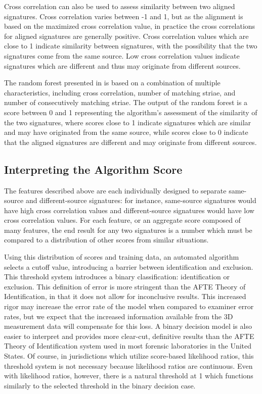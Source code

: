 \documentclass[doubleblind]{elsarticle}\usepackage[]{graphicx}\usepackage[]{color}
\begin{document}

Cross correlation can also be used to assess similarity between two aligned signatures. Cross correlation varies between -1 and 1, but as the alignment is based on the maximized cross correlation value, in practice the cross correlations for aligned signatures are generally positive. Cross correlation values which are close to 1 indicate similarity between signatures, with the possibility that the two signatures come from the same source. Low cross correlation values indicate signatures which are different and thus may originate from different sources.

The random forest presented in \citet{aoas} is based on a combination of multiple characteristics, including cross correlation, number of matching striae, and number of consecutively matching striae. The output of the random forest is a score between 0 and 1 representing the algorithm's assessment of the similarity of the two signatures, where scores close to 1 indicate signatures which are similar and may have originated from the same source, while scores close to 0 indicate that the aligned signatures are different and may originate from different sources.

\subsection{Interpreting the Algorithm Score}

The features described above are each individually designed to separate same-source and different-source signatures: for instance, same-source signatures would have high cross correlation values and different-source signatures would have low cross correlation values. For each feature, or an aggregate score composed of many features, the end result for any two signatures is a number which must be compared to a distribution of other scores from similar situations.

Using this distribution of scores and training data, an automated algorithm selects a cutoff value, introducing a barrier between identification and exclusion. This threshold system introduces a binary classification: identification or exclusion. This definition of error is more stringent than the AFTE Theory of Identification, in that it does not allow for inconclusive results. This increased rigor may increase the error rate of the model when compared to examiner error rates, but we expect that the increased information available from the 3D measurement data will compensate for this loss. A binary decision model is also easier to interpret and provides more clear-cut, definitive results than the AFTE Theory of Identification system used in most forensic laboratories in the United States. Of course, in jurisdictions which utilize score-based likelihood ratios, this threshold system is not necessary because likelihood ratios are continuous. Even with likelihood ratios, however, there is a natural threshold at 1 which functions similarly to the selected threshold in the binary decision case. 
\end{document}
